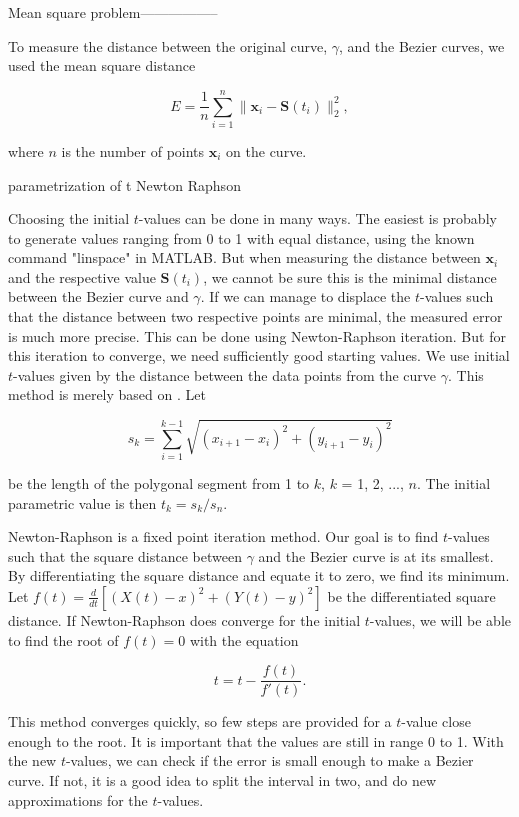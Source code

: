 \documentclass[10pt]{article}
\begin{document}
Mean square problem-----------------

To measure the distance between the original curve, $\gamma$, and the Bezier curves, we used the mean square distance 

\begin{equation}
E = \frac{1}{n} \sum_{i=1}^{n} \|\mathbf{x}_i - \mathbf{S}(t_i)\|^2_2,
\end{equation}

where $n$ is the number of points $\mathbf{x}_i$ on the curve. 

parametrization of t
Newton Raphson

Choosing the initial $t$-values can be done in many ways. The easiest is probably to generate values ranging from 0 to 1 with equal distance, using the known command "linspace" in MATLAB. But when measuring the distance between $\mathbf{x}_i$ and the respective value $\mathbf{S}(t_i)$, we cannot be sure this is the minimal distance between the Bezier curve and $\gamma$. If we can manage to displace the $t$-values such that the distance between two respective points are minimal, the measured error is much more precise. This can be done using Newton-Raphson iteration. But for this iteration to converge, we need sufficiently good starting values. We use initial $t$-values given by the distance between the data points from the curve $\gamma$. This method is merely based on \cite{Plass:1983}. Let

\begin{equation}
s_k = \sum_{i=1}^{k-1} \sqrt{(x_{i+1}-x_i)^2 + (y_{i+1}-y_i)^2}
\end{equation}

be the length of the polygonal segment from 1 to $k$, $k$ = 1, 2, ..., $n$. The initial parametric value is then $t_k = s_k/s_n$.

Newton-Raphson is a fixed point iteration method. Our goal is to find $t$-values such that the square distance between $\gamma$ and the Bezier curve is at its smallest. By  differentiating the square distance and equate it to zero, we find its minimum. Let $f(t) = \frac{d}{dt} [(X(t)-x)^2 + (Y(t)-y)^2 ]$ be the differentiated square distance. If Newton-Raphson does converge for the initial $t$-values, we will be able to find the root of $f(t) = 0$ with the equation

\begin{equation}
t = t - \frac{f(t)}{f'(t)}.
\end{equation}

This method converges quickly, so few steps are provided for a $t$-value close enough to the root. It is important that the values are still in range 0 to 1. With the new $t$-values, we can check if the error is small enough to make a Bezier curve. If not, it is a good idea to split the interval in two, and do new approximations for the $t$-values.
\end{document}
